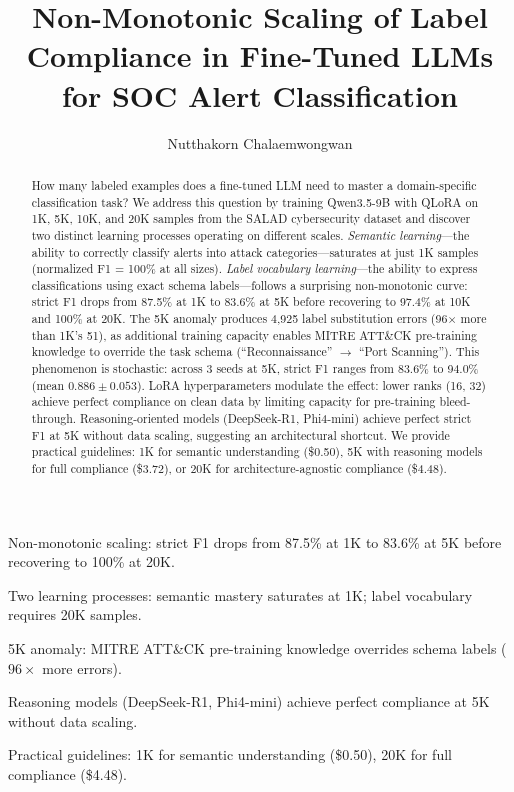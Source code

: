 \documentclass[review,3p]{elsarticle}
\begin{document}
\begin{frontmatter}

\title{Non-Monotonic Scaling of Label Compliance in Fine-Tuned LLMs for SOC Alert Classification}

\author[kmitl]{Nutthakorn Chalaemwongwan}
\address[kmitl]{Department of Computer Engineering, KOSEN-KMITL, King Mongkut's Institute of Technology Ladkrabang, Bangkok, Thailand}


\begin{highlights}
\item Non-monotonic scaling: strict F1 drops from 87.5\% at 1K to 83.6\% at 5K before recovering to 100\% at 20K.
\item Two learning processes: semantic mastery saturates at 1K; label vocabulary requires 20K samples.
\item 5K anomaly: MITRE ATT\&CK pre-training knowledge overrides schema labels ($96\times$ more errors).
\item Reasoning models (DeepSeek-R1, Phi4-mini) achieve perfect compliance at 5K without data scaling.
\item Practical guidelines: 1K for semantic understanding (\$0.50), 20K for full compliance (\$4.48).
\end{highlights}

\begin{abstract}
How many labeled examples does a fine-tuned LLM need to master a domain-specific classification task? We address this question by training Qwen3.5-9B with QLoRA on 1K, 5K, 10K, and 20K samples from the SALAD cybersecurity dataset and discover two distinct learning processes operating on different scales. \emph{Semantic learning}---the ability to correctly classify alerts into attack categories---saturates at just 1K samples (normalized F1 = 100\% at all sizes). \emph{Label vocabulary learning}---the ability to express classifications using exact schema labels---follows a surprising non-monotonic curve: strict F1 drops from 87.5\% at 1K to 83.6\% at 5K before recovering to 97.4\% at 10K and 100\% at 20K. The 5K anomaly produces 4,925 label substitution errors (96$\times$ more than 1K's 51), as additional training capacity enables MITRE ATT\&CK pre-training knowledge to override the task schema (``Reconnaissance'' $\to$ ``Port Scanning''). This phenomenon is stochastic: across 3 seeds at 5K, strict F1 ranges from 83.6\% to 94.0\% (mean $0.886 \pm 0.053$). LoRA hyperparameters modulate the effect: lower ranks (16, 32) achieve perfect compliance on clean data by limiting capacity for pre-training bleed-through. Reasoning-oriented models (DeepSeek-R1, Phi4-mini) achieve perfect strict F1 at 5K without data scaling, suggesting an architectural shortcut. We provide practical guidelines: 1K for semantic understanding (\$0.50), 5K with reasoning models for full compliance (\$3.72), or 20K for architecture-agnostic compliance (\$4.48).
\end{abstract}


\end{frontmatter}
\end{document}
